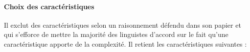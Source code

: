 \documentclass[a4paper, twoside]{article}
\begin{document}
    \paragraph{Choix des caractéristiques}

    Il exclut des caractéristiques selon un raisonnement défendu dans son papier et qui s’efforce de mettre la majorité des linguistes d’accord sur le fait qu’une caractéristique apporte de la complexité. Il retient les caractéristiques suivantes :
    
\end{document}
